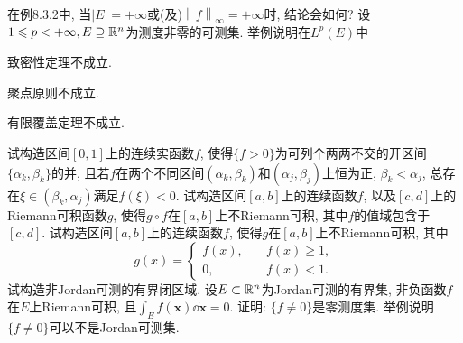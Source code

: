 \begin{quizb}
\woe 在例8.3.2中, 当\(|E|=+\infty\)或(及)\(\left\|f\right\|_{\infty}=+\infty\)时, 结论会如何?
\woe 设\(1\leqslant p<+\infty, E\supseteq\mathbb{R}^n\)为测度非零的可测集. 举例说明在\(L^p(E)\)中\begin{quizs}
\item 致密性定理不成立.
\item 聚点原则不成立.
\item 有限覆盖定理不成立.
\end{quizs}
\woe 试构造区间\([0,1]\)上的连续实函数\(f\), 使得\(\{f>0\}\)为可列个两两不交的开区间\(\{\alpha_k,\beta_k\}\)的并, 且若\(f\)在两个不同区间\((\alpha_k,\beta_k)\)和\((\alpha_j,\beta_j)\)上恒为正, \(\beta_k<\alpha_j\), 总存在\(\xi\in(\beta_k,\alpha_j)\)满足\(f(\xi)<0\).
\woe 试构造区间\([a,b]\)上的连续函数\(f\), 以及\([c,d]\)上的Riemann可积函数\(g\), 使得\(g\circ f\)在\([a,b]\)上不Riemann可积, 其中\(f\)的值域包含于\([c,d]\).
\woe 试构造区间\([a,b]\)上的连续函数\(f\), 使得\(g\)在\([a,b]\)上不Riemann可积, 其中\[g(x)=\begin{cases}
f(x),\quad&f(x)\geqslant 1,\\
0,& f(x)<1.
\end{cases}\]
\woe 试构造非Jordan可测的有界闭区域.
\woe 设\(E\subset\mathbb{R}^n\)为Jordan可测的有界集, 非负函数\(f\)在\(E\)上Riemann可积, 且\(\int_E f(\boldsymbol{x})\dd\boldsymbol{x}=0.\) 证明: \(\{f\ne 0\}\)是零测度集. 举例说明\(\{f\ne 0\}\)可以不是Jordan可测集.
\end{quizb}
